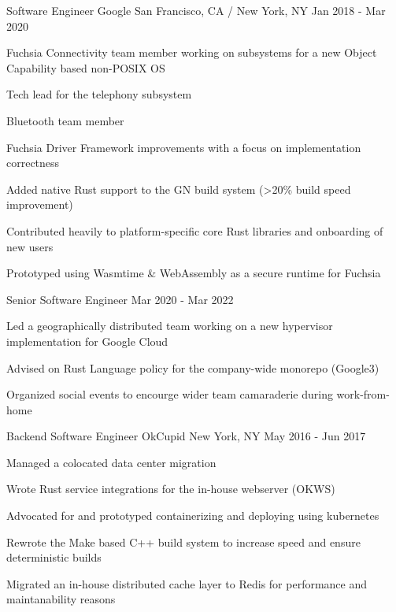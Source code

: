 

\newcommand{\SubItem}[1]{
    {\setlength\itemindent{15pt} \item[-] #1}
}

\begin{cventries}

  \cventrytwopositions
    {Software Engineer}
    {Google}
    {San Francisco, CA / New York, NY}
    {Jan 2018 - Mar 2020}
    {
      \begin{cvitems}
        \item {Fuchsia Connectivity team member working on subsystems for a new Object Capability based non-POSIX OS}
          \SubItem {Tech lead for the telephony subsystem}
          \SubItem {Bluetooth team member}
        \item {Fuchsia Driver Framework improvements with a focus on implementation correctness }
        \item {Added native Rust support to the GN build system (>20\% build speed improvement)}
        \item {Contributed heavily to platform-specific core Rust libraries and onboarding of new users}
        \item {Prototyped using Wasmtime \& WebAssembly as a secure runtime for Fuchsia}
      \end{cvitems}
    }
    {Senior Software Engineer}
    {Mar 2020 - Mar 2022}
    {
      \begin{cvitems}
        \item {Led a geographically distributed team working on a new hypervisor implementation for Google Cloud}
        \item {Advised on Rust Language policy for the company-wide monorepo (Google3)}
        \item {Organized social events to encourge wider team camaraderie during work-from-home }
      \end{cvitems}
    }

  \cventry
    {Backend Software Engineer}
    {OkCupid}
    {New York, NY}
    {May 2016 - Jun 2017}
    {
      \begin{cvitems}
        \item {Managed a colocated data center migration}
        \item {Wrote Rust service integrations for the in-house webserver (OKWS)}
        \item {Advocated for and prototyped containerizing and deploying using kubernetes}
        \item {Rewrote the Make based C++ build system to increase speed and ensure deterministic builds}
        \item {Migrated an in-house distributed cache layer to Redis for performance and maintanability reasons}
      \end{cvitems}
    }


\end{cventries}

